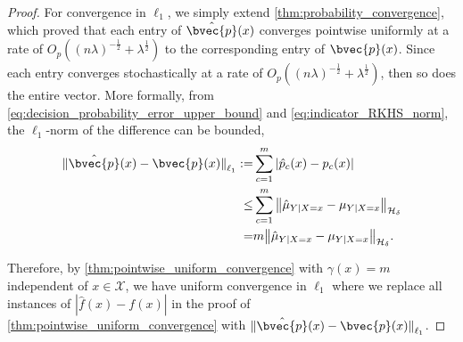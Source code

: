 \documentclass[runningheads, envcountsame, a4paper]{llncs}
\begin{document}
		\begin{proof}
			For convergence in $\ell_{1}$, we simply extend \cref{thm:probability_convergence}, which proved that each entry of $\hat{\bvec{p}}(x)$ converges pointwise uniformly at a rate of $O_{p}((n \lambda)^{-\frac{1}{2}} + \lambda^{\frac{1}{2}})$ to the corresponding entry of $\bvec{p}(x)$. Since each entry converges stochastically at a rate of $O_{p}((n \lambda)^{-\frac{1}{2}} + \lambda^{\frac{1}{2}})$, then so does the entire vector. More formally, from \eqref{eq:decision_probability_error_upper_bound} and \eqref{eq:indicator_RKHS_norm}, the $\ell_{1}$-norm of the difference can be bounded,
			\begin{equation}
			\begin{aligned}
				{\lVert \hat{\bvec{p}}(x) - \bvec{p}(x) \rVert}_{\ell_{1}} :=& \sum_{c = 1}^{m} | \hat{p}_{c}(x) - p_{c}(x) | \\
				\leq& \sum_{c = 1}^{m} \big\| \hat{\mu}_{Y | X = x} - \mu_{Y | X = x} \big\|_{\mathcal{H}_{\delta}} \\
				=& m \big\| \hat{\mu}_{Y | X = x} - \mu_{Y | X = x} \big\|_{\mathcal{H}_{\delta}}.
			\end{aligned}
			\end{equation}
			
			Therefore, by \cref{thm:pointwise_uniform_convergence} with $\gamma(x) = m$ independent of $x \in \mathcal{X}$, we have uniform convergence in $\ell_{1}$ where we replace all instances of $| \hat{f}(x) - f(x) |$ in the proof of \cref{thm:pointwise_uniform_convergence} with ${\lVert \hat{\bvec{p}}(x) - \bvec{p}(x) \rVert}_{\ell_{1}}$.
			

\end{proof}
\end{document}
